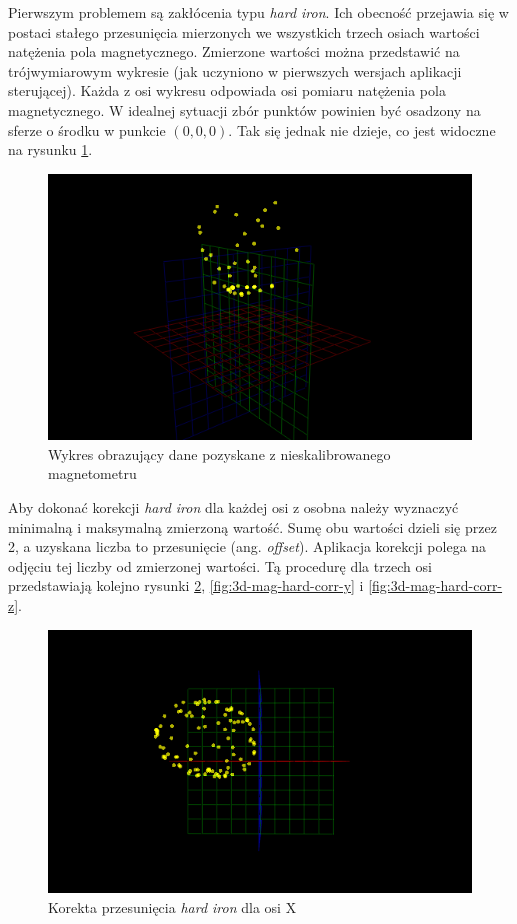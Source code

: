 Pierwszym problemem są zakłócenia typu \emph{hard iron}. Ich obecność przejawia się w postaci stałego przesunięcia mierzonych we wszystkich trzech osiach wartości natężenia pola magnetycznego. Zmierzone wartości można przedstawić na trójwymiarowym wykresie (jak uczyniono w pierwszych wersjach aplikacji sterującej). Każda z osi wykresu odpowiada osi pomiaru natężenia pola magnetycznego. W idealnej sytuacji zbór punktów powinien być osadzony na sferze o środku w punkcie $(0,0,0)$. Tak się jednak nie dzieje, co jest widoczne na rysunku \ref{fig:3d-mag-no-cal}.

\begin{figure}[ht]
	\centering
		\includegraphics[width=0.6\linewidth]{rys/ScanBot-03-magnetometer-3d-decalibrated.PNG}
	\caption{Wykres obrazujący dane pozyskane z nieskalibrowanego magnetometru}
	\label{fig:3d-mag-no-cal}
\end{figure}

Aby dokonać korekcji \emph{hard iron} \cite{hard-iron}\cite{hard-soft-iron} dla każdej osi z osobna należy wyznaczyć minimalną i maksymalną zmierzoną wartość. Sumę obu wartości dzieli się przez 2, a uzyskana liczba to przesunięcie (ang. \emph{offset}). Aplikacja korekcji polega na odjęciu tej liczby od zmierzonej wartości.
Tą procedurę dla trzech osi przedstawiają kolejno rysunki \ref{fig:3d-mag-hard-corr-x}, \ref{fig:3d-mag-hard-corr-y} i \ref{fig:3d-mag-hard-corr-z}.

\begin{figure}[H]
	\centering
		\includegraphics[width=0.6\linewidth]{rys/ScanBot-04-magnetometer-3d-calibration.PNG}
	\caption{Korekta przesunięcia \emph{hard iron} dla osi X}
	\label{fig:3d-mag-hard-corr-x}
\end{figure}

